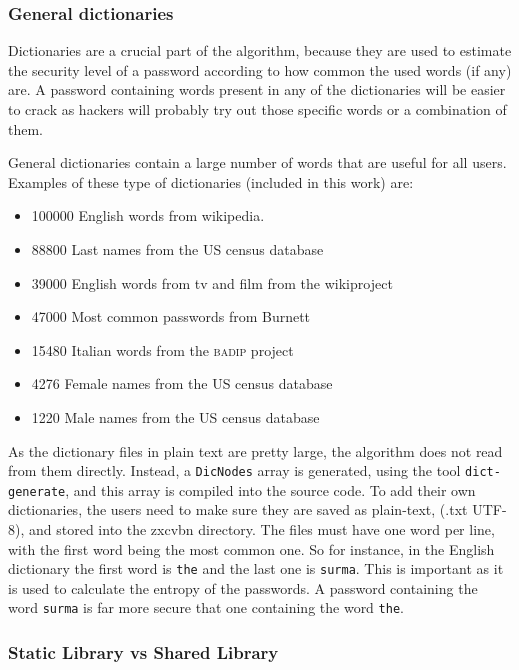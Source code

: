 \subsubsection*{General dictionaries}

Dictionaries are a crucial part of the algorithm, because they are used to estimate the security level of a password according to how common the used words (if any) are. A password containing words present in any of the dictionaries will be easier to crack as hackers will probably try out those specific words or a combination of them.

General dictionaries contain a large number of words that are useful for all users. Examples of these type of dictionaries (included in this work) are:
\begin{itemize}
\setlength\itemsep{-3pt}

\item 100000 English words from wikipedia.
\item 88800 Last names from the US census database
\item 39000 English words from tv and film from the wikiproject \cite{wiktionary}
\item 47000 Most common passwords from Burnett \cite{burnett}
\item 15480 Italian words from the \textsc{badip} project \cite{badip} 
\item 4276 Female names from the US census database 
\item 1220 Male names from the US census database
\end{itemize} 

As the dictionary files in plain text are pretty large, the algorithm does not read from them directly. Instead, a \texttt{DicNodes} array is generated, using the tool \texttt{dict-generate}, and this array is compiled into the source code.
To add their own dictionaries, the users need to make sure they are saved as plain-text, (.txt UTF-8), and stored into the zxcvbn directory. The files must have one word per line, with the first word being the most common one. So for instance, in the English dictionary the first word is \texttt{the} and the last one is \texttt{surma}. This is important as it is used to calculate the entropy of the passwords. A password containing the word \texttt{surma} is far more secure that one containing the word \texttt{the}.

\subsubsection*{Static Library vs Shared Library}

